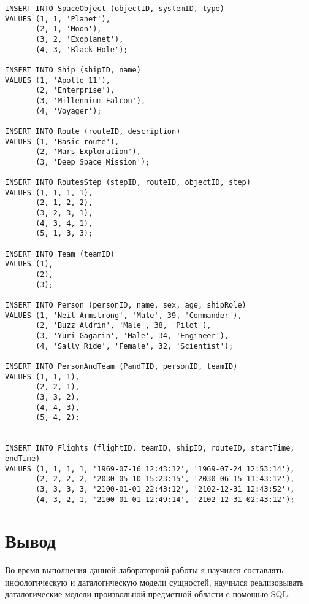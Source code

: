 \begin{lstlisting}
INSERT INTO SpaceObject (objectID, systemID, type)
VALUES (1, 1, 'Planet'),
       (2, 1, 'Moon'),
       (3, 2, 'Exoplanet'),
       (4, 3, 'Black Hole');

INSERT INTO Ship (shipID, name)
VALUES (1, 'Apollo 11'),
       (2, 'Enterprise'),
       (3, 'Millennium Falcon'),
       (4, 'Voyager');

INSERT INTO Route (routeID, description)
VALUES (1, 'Basic route'),
       (2, 'Mars Exploration'),
       (3, 'Deep Space Mission');

INSERT INTO RoutesStep (stepID, routeID, objectID, step)
VALUES (1, 1, 1, 1),
       (2, 1, 2, 2),
       (3, 2, 3, 1),
       (4, 3, 4, 1),
       (5, 1, 3, 3);

INSERT INTO Team (teamID)
VALUES (1),
       (2),
       (3);

INSERT INTO Person (personID, name, sex, age, shipRole)
VALUES (1, 'Neil Armstrong', 'Male', 39, 'Commander'),
       (2, 'Buzz Aldrin', 'Male', 38, 'Pilot'),
       (3, 'Yuri Gagarin', 'Male', 34, 'Engineer'),
       (4, 'Sally Ride', 'Female', 32, 'Scientist');

INSERT INTO PersonAndTeam (PandTID, personID, teamID)
VALUES (1, 1, 1),
       (2, 2, 1),
       (3, 3, 2),
       (4, 4, 3),
       (5, 4, 2);


INSERT INTO Flights (flightID, teamID, shipID, routeID, startTime, endTime)
VALUES (1, 1, 1, 1, '1969-07-16 12:43:12', '1969-07-24 12:53:14'),
       (2, 2, 2, 2, '2030-05-10 15:23:15', '2030-06-15 11:43:12'),
       (3, 3, 3, 3, '2100-01-01 22:43:12', '2102-12-31 12:43:52'),
       (4, 3, 2, 1, '2100-01-01 12:49:14', '2102-12-31 02:43:12');
\end{lstlisting}
\section{Вывод}
Во время выполнения данной лабораторной работы я научился составлять инфологическую и даталогическую модели сущностей, научился реализовывать даталогические модели произвольной предметной области с помощью SQL.
